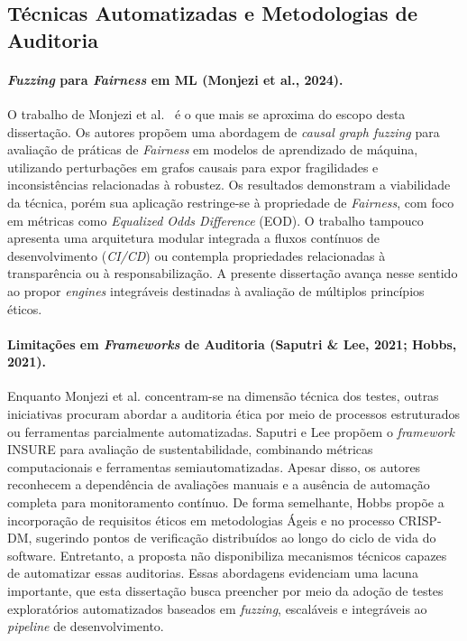 \subsection{Técnicas Automatizadas e Metodologias de Auditoria}
\label{sec:tecnicas-correlatas}

\paragraph{\textbf{\textit{Fuzzing} para \textit{Fairness} em ML (Monjezi et al., 2024).}}

O trabalho de Monjezi et al.~\cite{Monjezi2024} é o que mais se aproxima do escopo desta dissertação. Os autores propõem uma abordagem de \textit{causal graph fuzzing} para avaliação de práticas de \textit{Fairness} em modelos de aprendizado de máquina, utilizando perturbações em grafos causais para expor fragilidades e inconsistências relacionadas à robustez. Os resultados demonstram a viabilidade da técnica, porém sua aplicação restringe-se à propriedade de \textit{Fairness}, com foco em métricas como \textit{Equalized Odds Difference} (EOD). O trabalho tampouco apresenta uma arquitetura modular integrada a fluxos contínuos de desenvolvimento (\textit{CI/CD}) ou contempla propriedades relacionadas à transparência ou à responsabilização. A presente dissertação avança nesse sentido ao propor \textit{engines} integráveis destinadas à avaliação de múltiplos princípios éticos.

\paragraph{\textbf{Limitações em \textit{Frameworks} de Auditoria (Saputri \& Lee, 2021; Hobbs, 2021).}}

Enquanto Monjezi et al. concentram-se na dimensão técnica dos testes, outras iniciativas procuram abordar a auditoria ética por meio de processos estruturados ou ferramentas parcialmente automatizadas. Saputri e Lee \cite{S005} propõem o \textit{framework} INSURE para avaliação de sustentabilidade, combinando métricas computacionais e ferramentas semiautomatizadas. Apesar disso, os autores reconhecem a dependência de avaliações manuais e a ausência de automação completa para monitoramento contínuo. De forma semelhante, Hobbs \cite{S046} propõe a incorporação de requisitos éticos em metodologias Ágeis e no processo CRISP-DM, sugerindo pontos de verificação distribuídos ao longo do ciclo de vida do software. Entretanto, a proposta não disponibiliza mecanismos técnicos capazes de automatizar essas auditorias. Essas abordagens evidenciam uma lacuna importante, que esta dissertação busca preencher por meio da adoção de testes exploratórios automatizados baseados em \textit{fuzzing}, escaláveis e integráveis ao \textit{pipeline} de desenvolvimento.

